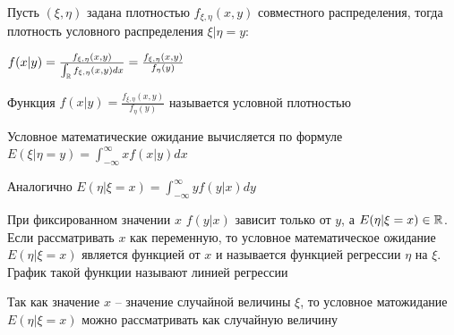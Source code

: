 \documentclass[12pt]{article}
\begin{document}
    \hypertarget{conditionaldistributionincontinuoussystem}{}

    Пусть $(\xi, \eta)$ задана плотностью $f_{\xi, \eta}(x, y)$ совместного распределения, тогда плотность 
    условного распределения $\xi | \eta = y$: 

    $f(x | y) = \frac{f_{\xi, \eta}(x, y)}{\int_{\mathbb{R}} f_{\xi, \eta}(x, y)dx} = \frac{f_{\xi, \eta}(x, y)}{f_{\eta}(y)}$

    \Def Функция $f(x | y) = \frac{f_{\xi, \eta}(x, y)}{f_{\eta}(y)}$ называется условной плотностью

    \Def Условное математические ожидание вычисляется по формуле $E(\xi | \eta = y) = \int_{-\infty}^\infty xf(x | y)dx$

    Аналогично $E(\eta | \xi = x) = \int_{-\infty}^\infty yf(y | x)dy$

    \Nota При фиксированном значении $x$ $f(y | x)$ зависит только от $y$, а $E(\eta | \xi = x) \in \mathbb{R}$. 
    Если рассматривать $x$ как переменную, то условное математическое ожидание $E(\eta | \xi = x)$ является
    функцией от $x$ и называется функцией регрессии $\eta$ на $\xi$. График такой функции называют линией регрессии

    \Nota Так как значение $x$ -- значение случайной величины $\xi$, то условное матожидание $E(\eta | \xi = x)$ 
    можно рассматривать как случайную величину
\end{document}
